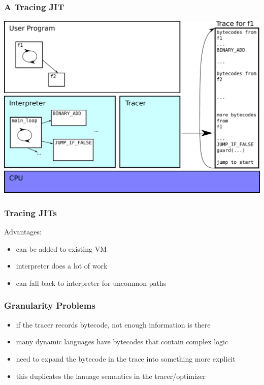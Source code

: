 \documentclass[utf8x]{beamer}
\begin{document}
\begin{frame}
  \frametitle{A Tracing JIT}
  \includegraphics[scale=0.5]{figures/trace04.pdf}
\end{frame}

\begin{frame}
  \frametitle{Tracing JITs}
  Advantages:
  \begin{itemize}
      \item can be added to existing VM
      \item interpreter does a lot of work
      \item can fall back to interpreter for uncommon paths
  \end{itemize}
\end{frame}

\begin{frame}
  \frametitle{Granularity Problems}
  \begin{itemize}
      \item if the tracer records bytecode, not enough information is there
      \item many dynamic languages have bytecodes that contain complex logic
      \item need to expand the bytecode in the trace into something more explicit
      \item this duplicates the lanuage semantics in the tracer/optimizer
  \end{itemize}
\end{frame}
\end{document}
